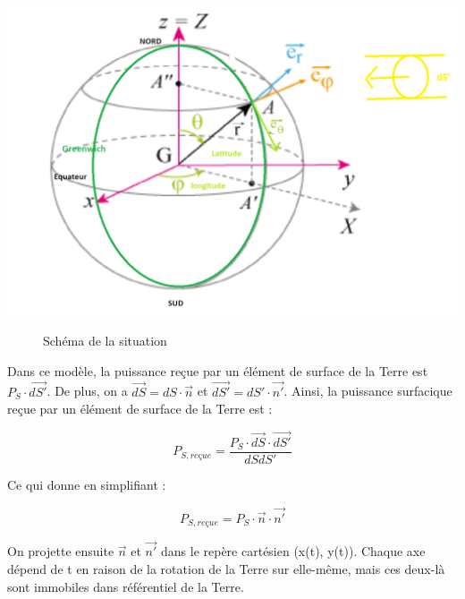 \documentclass[a4paper,11pt]{article}
\begin{document}
\begin{adjustbox}{center}
\includegraphics[scale=0.32]{Rayons_terre}
\end{adjustbox}
\begin{figure}[h]
  \centering
  \caption{Schéma de la situation}
\end{figure}

Dans ce modèle, la puissance reçue par un élément de surface de la Terre est $P_S \cdot \overrightarrow{dS'}$. De plus, on a $\overrightarrow{dS} = dS \cdot \vec{n}$ et $\overrightarrow{dS'} = dS' \cdot \vec{n'}$. Ainsi, la puissance surfacique reçue par un élément de surface de la Terre est :

\[ P_{S, reçue} = \dfrac{P_S \cdot \overrightarrow{dS} \cdot \overrightarrow{dS'}}{dSdS'} \]

Ce qui donne en simplifiant :

\[ P_{S,reçue} = P_S \cdot \vec{n} \cdot \vec{n'} \]

On projette ensuite $\vec{n}$ et $\vec{n'}$ dans le repère cartésien (x(t), y(t)). Chaque axe dépend de t en raison de la rotation de la Terre sur elle-même, mais ces deux-là sont immobiles dans référentiel de la Terre.
\end{document}
